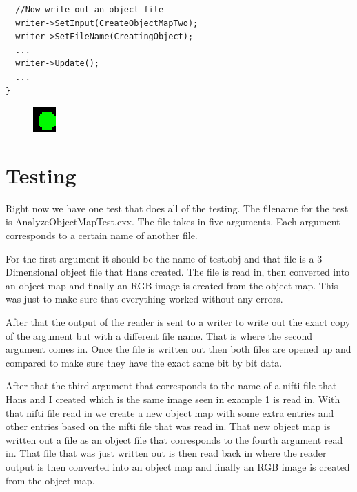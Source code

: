 \documentclass{InsightArticle}
\begin{document}
\begin{itemize}
\begin{verbatim}
  //Now write out an object file
  writer->SetInput(CreateObjectMapTwo);
  writer->SetFileName(CreatingObject);
  ...
  writer->Update();
  ...
}
\end{verbatim} \normalsize

\begin{figure}[h]
\center
\includegraphics[width=.14\textwidth]{circle.eps}
\label{fig:StreamingConceptDiagram}
\end{figure}


\end{itemize}

\section{Testing}

Right now we have one test that does all of the testing.  The filename for the test is AnalyzeObjectMapTest.cxx.  The file takes in five arguments.
Each argument corresponds to a certain name of another file.  

For the first argument it should be the name of test.obj and that file is a 3-Dimensional object file that Hans created.  The file is read in, then converted into an object map and finally an RGB image is created from the object map.  This was just to make sure that everything worked without any errors.  

After that the output of the reader is sent to a writer to write out the exact copy of the argument but with a different file name.  That is where the second argument comes in.  Once the file is written out then both files are opened up and compared to make sure they have the exact same bit by bit data.  

After that the third argument that corresponds to the name of a nifti file that Hans and I created which is the same image seen in example 1 is read in.  With that nifti file read in we create a new object map with some extra entries and other entries based on the nifti file that was read in.  That new object map is written out a file as an object file that corresponds to the fourth argument read in.  That file that was just written out is then read back in where the reader output is then converted into an object map and finally an RGB image is created from the object map.  
\end{document}
